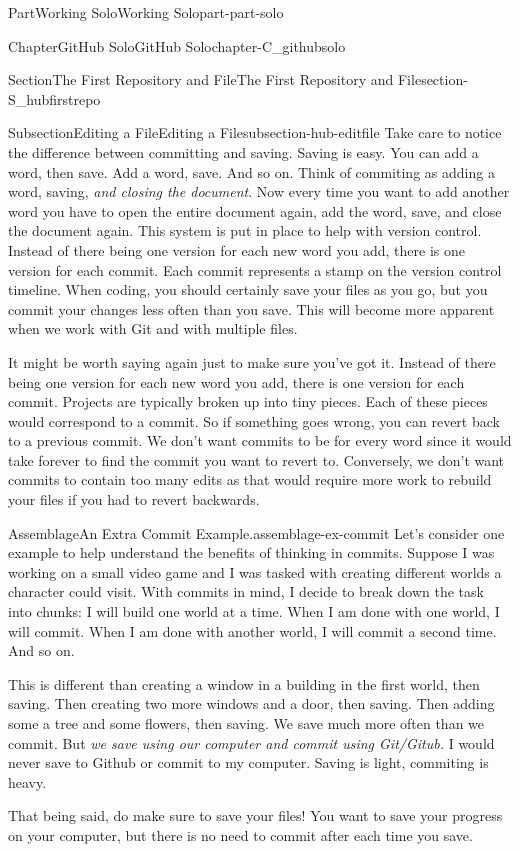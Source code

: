 \documentclass[twoside,10pt,]{book}
\begin{document}
\begin{partptx}{Part}{Working Solo}{}{Working Solo}{}{}{part-part-solo}
\begin{chapterptx}{Chapter}{GitHub Solo}{}{GitHub Solo}{}{}{chapter-C_githubsolo}
\begin{sectionptx}{Section}{The First Repository and File}{}{The First Repository and File}{}{}{section-S_hubfirstrepo}
\begin{subsectionptx}{Subsection}{Editing a File}{}{Editing a File}{}{}{subsection-hub-editfile}
Take care to notice the difference between committing and saving. Saving is easy. You can add a word, then save. Add a word, save. And so on. Think of commiting as adding a word, saving, \emph{and closing the document}. Now every time you want to add another word you have to open the entire document again, add the word, save, and close the document again. This system is put in place to help with version control. Instead of there being one version for each new word you add, there is one version for each commit. Each commit represents a stamp on the version control timeline. When coding, you should certainly save your files as you go, but you commit your changes less often than you save. This will become more apparent when we work with Git and with multiple files.%
\par
It might be worth saying again just to make sure you've got it. Instead of there being one version for each new word you add, there is one version for each commit. Projects are typically broken up into tiny pieces. Each of these pieces would correspond to a commit. So if something goes wrong, you can revert back to a previous commit. We don't want commits to be for every word since it would take forever to find the commit you want to revert to. Conversely, we don't want commits to contain too many edits as that would require more work to rebuild your files if you had to revert backwards.%
\begin{assemblage}{Assemblage}{An Extra Commit Example.}{assemblage-ex-commit}%
Let's consider one example to help understand the benefits of thinking in commits. Suppose I was working on a small video game and I was tasked with creating different worlds a character could visit. With commits in mind, I decide to break down the task into chunks: I will build one world at a time. When I am done with one world, I will commit. When I am done with another world, I will commit a second time. And so on.%
\par
This is different than creating a window in a building in the first world, then saving. Then creating two more windows and a door, then saving. Then adding some a tree and some flowers, then saving. We save much more often than we commit. But \emph{we save using our computer and commit using Git\slash{}Gitub.} I would never save to Github or commit to my computer. Saving is light, commiting is heavy.%
\par
That being said, do make sure to save your files! You want to save your progress on your computer, but there is no need to commit after each time you save.%

\end{assemblage}
\end{subsectionptx}
\end{sectionptx}
\end{chapterptx}
\end{partptx}
\end{document}

